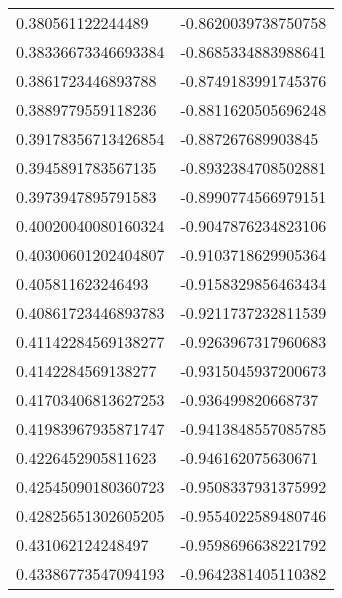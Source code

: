 \begin{supertabular}{ll}
0.380561122244489   & -0.8620039738750758   \\
0.38336673346693384 & -0.8685334883988641   \\
0.3861723446893788  & -0.8749183991745376   \\
0.3889779559118236  & -0.8811620505696248   \\
0.39178356713426854 & -0.887267689903845    \\
0.3945891783567135  & -0.8932384708502881   \\
0.3973947895791583  & -0.8990774566979151   \\
0.40020040080160324 & -0.9047876234823106   \\
0.40300601202404807 & -0.9103718629905364   \\
0.405811623246493   & -0.9158329856463434   \\
0.40861723446893783 & -0.9211737232811539   \\
0.41142284569138277 & -0.9263967317960683   \\
0.4142284569138277  & -0.9315045937200673   \\
0.41703406813627253 & -0.936499820668737    \\
0.41983967935871747 & -0.9413848557085785   \\
0.4226452905811623  & -0.946162075630671    \\
0.42545090180360723 & -0.9508337931375992   \\
0.42825651302605205 & -0.9554022589480746   \\
0.431062124248497   & -0.9598696638221792   \\
0.43386773547094193 & -0.9642381405110382   \\
\end{supertabular}
